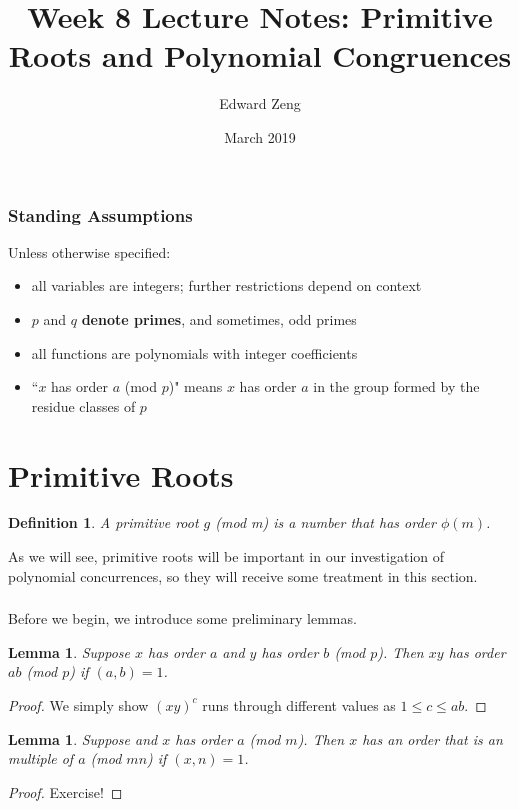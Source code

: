 \documentclass{article}
\title{Week 8 Lecture Notes: Primitive Roots and Polynomial Congruences}
\author{Edward Zeng}
\date{March 2019}
\newtheorem{lemma}[theorem]{Lemma}
\newtheorem{definition}{Definition}
\begin{document}
\maketitle

\subsubsection{Standing Assumptions}
Unless otherwise specified:
\begin{itemize}
    \item all variables are integers; further restrictions depend on context
    \item $p$ and $q$ \textbf{denote primes}, and sometimes, odd primes
    \item all functions are polynomials with integer coefficients
    \item ``$x$ has order $a$ (mod $p$)" means $x$ has order $a$ in the group formed by the residue classes of $p$
\end{itemize}

\section{Primitive Roots}
\begin{definition}
    A primitive root $g$ (mod m) is a number that has order $\phi(m)$.
\end{definition}
As we will see, primitive roots will be important in our investigation of polynomial concurrences, so they will receive some treatment in this section.

\subsubsection{}
Before we begin, we introduce some preliminary lemmas.
\begin{lemma}
    Suppose $x$ has order $a$ and $y$ has order $b$ (mod $p$). Then $xy$ has order $ab$ (mod $p$) if $(a,b) = 1$.
\end{lemma}
\begin{proof}
    We simply show $(xy)^{c}$ runs through different values as $1 \leq c \leq ab$.
\end{proof}
\begin{lemma}
    Suppose and $x$ has order $a$ (mod $m$). Then $x$ has an order that is an multiple of $a$ (mod $mn$) if $(x,n) = 1$.
\end{lemma}
\begin{proof}
    Exercise!
\end{proof}
\end{document}
